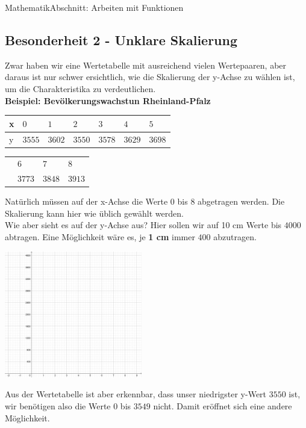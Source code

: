 \documentclass[11pt,twocolumn,oneside,openany,headings=optiontotoc,11pt,numbers=noenddot]{article}
\begin{document}
\begin{worksheet}{}{Mathematik}{Abschnitt: Arbeiten mit Funktionen}
		\subsection{Besonderheit 2 - Unklare Skalierung}
		Zwar haben wir eine Wertetabelle mit ausreichend vielen Wertepaaren, aber daraus ist nur schwer ersichtlich, wie die Skalierung der y-Achse zu wählen ist, um die Charakteristika zu verdeutlichen.\\
		\textbf{Beispiel: Bevölkerungswachstun Rheinland-Pfalz}\\
		\begin{tabularx}{0.49\textwidth}{|l|X|X|X|X|X|X|}
			\hline
			x & \(0\) & \(1\) & \(2\) & \(3\) & \(4\) & \(5\)\\
			\hline
			y & \(3555\) & \(3602\) & \(3550\) & \(3578\) & \(3629\) & \(3698\)\\
			\hline
		\end{tabularx}
		\par\bigskip\noindent
		\begin{tabularx}{0.5\textwidth}{l|l|l|l|}
			\cline{2-4}
			& \(6\) & \(7\) & \(8\)\\
			\cline{2-4}
			& \(3773\) & \(3848\) & \(3913\)\\
			\cline{2-4}
		\end{tabularx}
		\par\bigskip\noindent
		Natürlich müssen auf der x-Achse die Werte 0 bis 8 abgetragen werden. Die Skalierung kann hier wie üblich gewählt werden.\\
		Wie aber sieht es auf der y-Achse aus? Hier sollen wir auf 10 cm Werte bis \(4000\) abtragen. Eine Möglichkeit wäre es, je \textbf{1 cm} immer \(400\) abzutragen.\\
		\par\bigskip\noindent
		\includegraphics[width=0.45\textwidth]{../99_Bilder/b2Koord.jpg}\\
		\par\bigskip\noindent
		Aus der Wertetabelle ist aber erkennbar, dass unser niedrigster y-Wert \(3550\) ist, wir benötigen also die Werte 0 bis \(3549\) nicht. Damit eröffnet sich eine andere Möglichkeit.\\

\end{worksheet}
\end{document}
